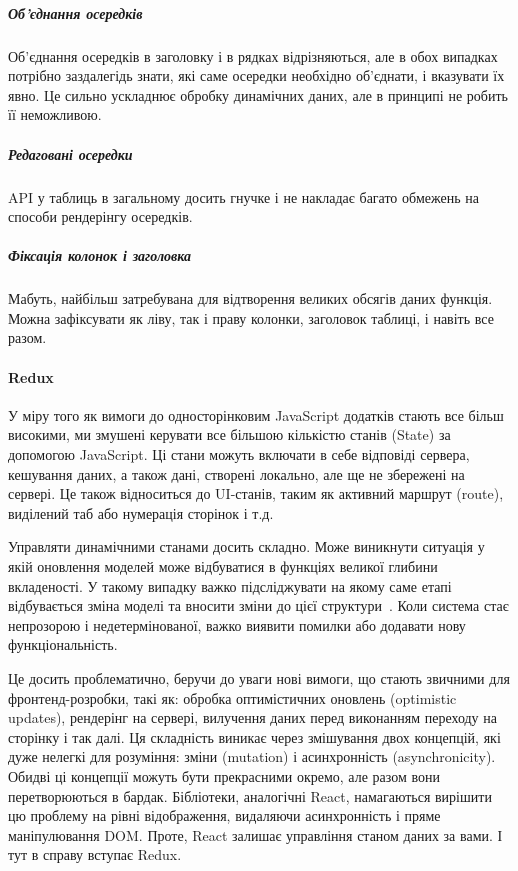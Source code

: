 \subparagraph{Об'єднання осередків}
Об'єднання осередків в заголовку і в рядках відрізняються, але в обох випадках потрібно заздалегідь знати, які саме осередки необхідно об'єднати, і вказувати їх явно. Це сильно ускладнює обробку динамічних даних, але в принципі не робить її неможливою.

\subparagraph{Редаговані осередки}
API у таблиць в загальному досить гнучке і не накладає багато обмежень на способи рендерінгу осередків. 

\subparagraph{Фіксація колонок і заголовка}
Мабуть, найбільш затребувана для відтворення великих обсягів даних функція. Можна зафіксувати як ліву, так і праву колонки, заголовок таблиці, і навіть все разом.

\paragraph{Redux}

У міру того як вимоги до односторінковим JavaScript додатків стають все більш високими, ми змушені керувати все більшою кількістю станів (State) за допомогою JavaScript. Ці стани можуть включати в себе відповіді сервера, кешування даних, а також дані, створені локально, але ще не збережені на сервері. Це також відноситься до UI-станів, таким як активний маршрут (route), виділений таб або нумерація сторінок і т.д.

Управляти динамічними станами досить складно. Може виникнути ситуація у якій оновлення моделей може відбуватися в функціях великої глибини вкладеності. У такому випадку важко підсліджувати на якому саме етапі відбувається зміна моделі та вносити зміни до цієї структури~\cite{robinwieruch2018}. Коли система стає непрозорою і недетермінованої, важко виявити помилки або додавати нову функціональність.

Це досить проблематично, беручи до уваги нові вимоги, що стають звичними для фронтенд-розробки, такі як: обробка оптимістичних оновлень (optimistic updates), рендерінг на сервері, вилучення даних перед виконанням переходу на сторінку і так далі.  Ця складність виникає через змішування двох концепцій, які дуже нелегкі для розуміння: зміни (mutation) і асинхронність (asynchronicity). Обидві ці концепції можуть бути прекрасними окремо, але разом вони перетворюються в бардак. Бібліотеки, аналогічні React, намагаються вирішити цю проблему на рівні відображення, видаляючи асинхронність і пряме маніпулювання DOM. Проте, React залишає управління станом даних за вами. І тут в справу вступає Redux.

